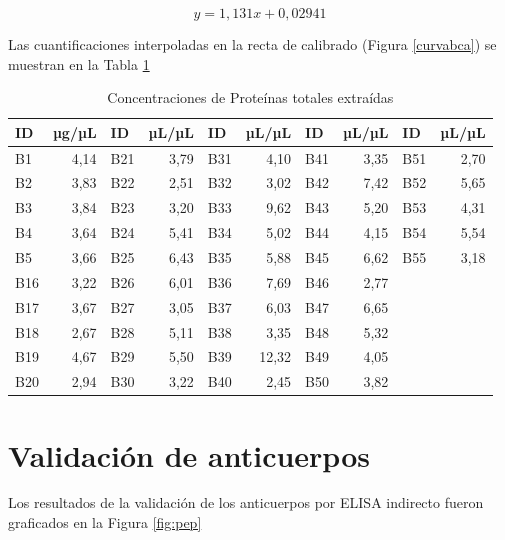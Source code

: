 \documentclass[12pt,letterpaper,oneside]{scrbook}
\begin{document}
\begin{displaymath}
y=1,131x+0,02941
\label{eq:BCA}
\end{displaymath}

Las cuantificaciones interpoladas en la recta de calibrado (Figura
\ref{curvabca}) se muestran en la Tabla \ref{tablaPROTEINAS}

\begin{table}[h]
\begin{center}
    \begin{threeparttable}
      \caption{Concentraciones de Proteínas totales extraídas}\label{tablaPROTEINAS}
      \begin{tabular}{l r l r l r l r l r}
    \toprule
    \textbf{ID} & \textbf{µg/µL} & \textbf{ID} & \textbf{µL/µL} & \textbf{ID} & \textbf{µL/µL} & \textbf{ID} & \textbf{µL/µL} & \textbf{ID} & \textbf{µL/µL}\\
    \midrule
    B1 & 4,14 & B21 & 3,79 & B31 & 4,10 & B41 & 3,35 & B51 & 2,70 \\
    B2 & 3,83 & B22 & 2,51 & B32 & 3,02 & B42 & 7,42 & B52 & 5,65 \\
    B3 & 3,84 & B23 & 3,20 & B33 & 9,62 & B43 & 5,20 & B53 & 4,31 \\
    B4 & 3,64 & B24 & 5,41 & B34 & 5,02 & B44 & 4,15 & B54 & 5,54 \\
    B5 & 3,66 & B25 & 6,43 & B35 & 5,88 & B45 & 6,62 & B55 & 3,18 \\
    B16 & 3,22 & B26 & 6,01 & B36 & 7,69 & B46 & 2,77 & \\
    B17 & 3,67 & B27 & 3,05 & B37 & 6,03 & B47 & 6,65 & \\
    B18 & 2,67 & B28 & 5,11 & B38 & 3,35 & B48 & 5,32 & \\
    B19 & 4,67 & B29 & 5,50 & B39 & 12,32 & B49 & 4,05 & \\
    B20 & 2,94 & B30 & 3,22 & B40 & 2,45 & B50 & 3,82 & \\
\bottomrule
\end{tabular}
\end{threeparttable}
\end{center}
\end{table}

\section{Validación de anticuerpos}

Los resultados de la validación de los anticuerpos por ELISA indirecto
fueron graficados en la Figura \ref{fig:pep}
\end{document}
